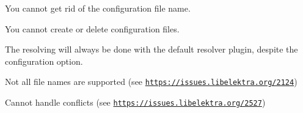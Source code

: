 


\begin{DoxyItemize}
\item You cannot get rid of the configuration file name.
\item You cannot create or delete configuration files.
\item The resolving will always be done with the default resolver plugin, despite the configuration option.
\item Not all file names are supported (see \href{https://issues.libelektra.org/2124}{\tt https\+://issues.\+libelektra.\+org/2124})
\item Cannot handle conflicts (see \href{https://issues.libelektra.org/2527}{\tt https\+://issues.\+libelektra.\+org/2527}) 
\end{DoxyItemize}